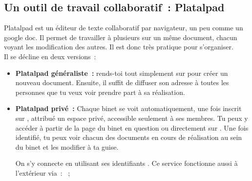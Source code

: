 \subsection{Un outil de travail collaboratif~: Platalpad}
\label{platalpad}


Platalpad est un éditeur de texte collaboratif par navigateur, un peu comme un google doc. Il permet de travailler à plusieurs sur un même document, chacun voyant les modification des autres. Il est donc très pratique pour s'organiser.\\
Il se décline en deux versions~:
\begin{itemize}

\item \textbf{Platalpad généraliste~:} rends-toi tout simplement sur  pour créer un nouveau document. Ensuite, il suffit de diffuser son adresse à toutes les personnes que tu veux voir prendre part à sa réalisation. \\

\item \textbf{Platalpad privé~:} Chaque binet se voit automatiquement, une fois inscrit sur \fkz, attribué un espace privé, accessible seulement à ses membres. Tu peux y accéder à partir de la page \fkz du binet en question ou directement sur . Une fois identifié, tu peux voir chacun des documents en cours de réalisation au sein du binet et les modifier à ta guise.

On s'y connecte en utilisant ses identifiants \fkz. Ce service fonctionne aussi à l'extérieur via~:
~;

\end{itemize}

